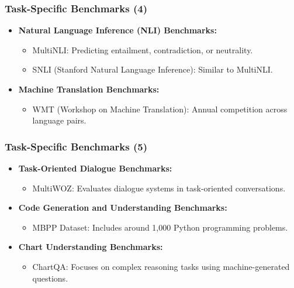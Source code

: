 \begin{frame}[fragile]\frametitle{Task-Specific Benchmarks (4)}
  \begin{itemize}
    \item \textbf{Natural Language Inference (NLI) Benchmarks:}
      \begin{itemize}
        \item MultiNLI: Predicting entailment, contradiction, or neutrality.
        \item SNLI (Stanford Natural Language Inference): Similar to MultiNLI.
      \end{itemize}
    \item \textbf{Machine Translation Benchmarks:}
      \begin{itemize}
        \item WMT (Workshop on Machine Translation): Annual competition across language pairs.
      \end{itemize}
  \end{itemize}
\end{frame}

\begin{frame}[fragile]\frametitle{Task-Specific Benchmarks (5)}
  \begin{itemize}
    \item \textbf{Task-Oriented Dialogue Benchmarks:}
      \begin{itemize}
        \item MultiWOZ: Evaluates dialogue systems in task-oriented conversations.
      \end{itemize}
    \item \textbf{Code Generation and Understanding Benchmarks:}
      \begin{itemize}
        \item MBPP Dataset: Includes around 1,000 Python programming problems.
      \end{itemize}
    \item \textbf{Chart Understanding Benchmarks:}
      \begin{itemize}
        \item ChartQA: Focuses on complex reasoning tasks using machine-generated questions.
      \end{itemize}
  \end{itemize}
\end{frame}


